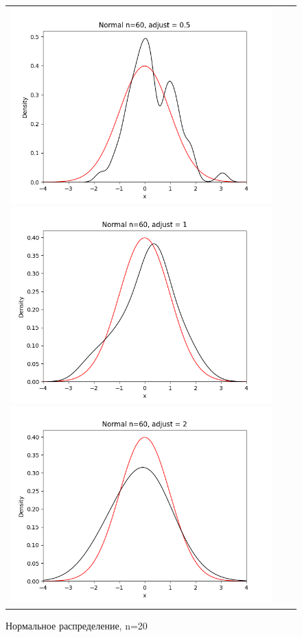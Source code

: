 \begin{figure}[H]
	\begin{tabular}{ccc}
		\includegraphics[scale=0.33]{normal_n60_adjust0.5.png}
		\includegraphics[scale=0.33]{normal_n60_adjust1.png}
		\includegraphics[scale=0.33]{normal_n60_adjust2.png}
	\end{tabular}
	\caption{Нормальное распределение, n=20}
\end{figure}

